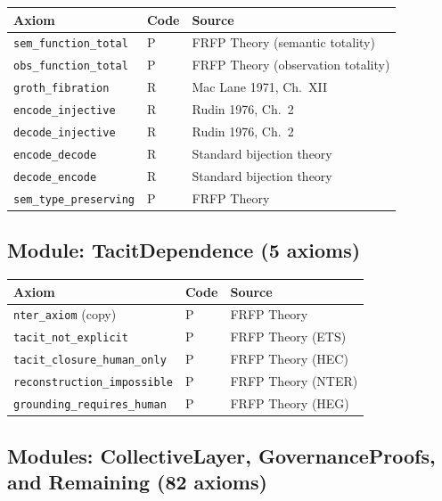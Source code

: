 \begin{center}
\begin{tabular}{lll}
\toprule
Axiom & Code & Source \\
\midrule
\texttt{sem\_function\_total} & P & FRFP Theory (semantic totality) \\
\texttt{obs\_function\_total} & P & FRFP Theory (observation totality) \\
\texttt{groth\_fibration} & R & Mac Lane 1971, Ch.~XII \\
\texttt{encode\_injective} & R & Rudin 1976, Ch.~2 \\
\texttt{decode\_injective} & R & Rudin 1976, Ch.~2 \\
\texttt{encode\_decode} & R & Standard bijection theory \\
\texttt{decode\_encode} & R & Standard bijection theory \\
\texttt{sem\_type\_preserving} & P & FRFP Theory \\
\bottomrule
\end{tabular}
\end{center}

\subsection*{Module: TacitDependence (5 axioms)}

\begin{center}
\begin{tabular}{lll}
\toprule
Axiom & Code & Source \\
\midrule
\texttt{nter\_axiom} (copy) & P & FRFP Theory \\
\texttt{tacit\_not\_explicit} & P & FRFP Theory (ETS) \\
\texttt{tacit\_closure\_human\_only} & P & FRFP Theory (HEC) \\
\texttt{reconstruction\_impossible} & P & FRFP Theory (NTER) \\
\texttt{grounding\_requires\_human} & P & FRFP Theory (HEG) \\
\bottomrule
\end{tabular}
\end{center}

\subsection*{Modules: CollectiveLayer, GovernanceProofs, and Remaining (82 axioms)}

